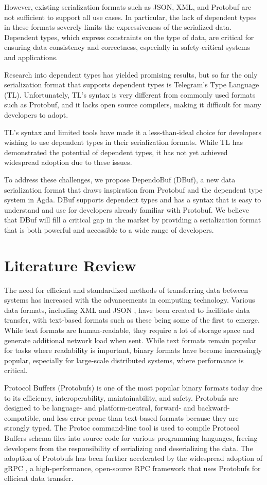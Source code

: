 \documentclass[conference]{IEEEtran}
\begin{document}
However, existing serialization formats such as JSON, XML, and Protobuf are not sufficient to support all use cases. In particular, the lack of dependent types in these formats severely limits the expressiveness of the serialized data. Dependent types, which express constraints on the type of data, are critical for ensuring data consistency and correctness, especially in safety-critical systems and applications.

Research into dependent types has yielded promising results, but so far the only serialization format that supports dependent types is Telegram's Type Language (TL). Unfortunately, TL's syntax is very different from commonly used formats such as Protobuf, and it lacks open source compilers, making it difficult for many developers to adopt.

TL's syntax and limited tools have made it a less-than-ideal choice for developers wishing to use dependent types in their serialization formats. While TL has demonstrated the potential of dependent types, it has not yet achieved widespread adoption due to these issues.

To address these challenges, we propose DependoBuf (DBuf), a new data serialization format that draws inspiration from Protobuf and the dependent type system in Agda. DBuf supports dependent types and has a syntax that is easy to understand and use for developers already familiar with Protobuf. We believe that DBuf will fill a critical gap in the market by providing a serialization format that is both powerful and accessible to a wide range of developers.

\section{Literature Review}
The need for efficient and standardized methods of transferring data between systems has increased with the advancements in computing technology. Various data formats, including XML \cite{xml} and JSON \cite{json}, have been created to facilitate data transfer, with text-based formats such as these being some of the first to emerge. While text formats are human-readable, they require a lot of storage space and generate additional network load when sent. While text formats remain popular for tasks where readability is important, binary formats have become increasingly popular, especially for large-scale distributed systems, where performance is critical.

Protocol Buffers (Protobufs) \cite{protobuf} is one of the most popular binary formats today due to its efficiency, interoperability, maintainability, and safety. Protobufs are designed to be language- and platform-neutral, forward- and backward-compatible, and less error-prone than text-based formats because they are strongly typed. The Protoc command-line tool is used to compile Protocol Buffers schema files into source code for various programming languages, freeing developers from the responsibility of serializing and deserializing the data. The adoption of Protobufs has been further accelerated by the widespread adoption of gRPC \cite{grpc}, a high-performance, open-source RPC framework that uses Protobufs for efficient data transfer.
\end{document}
